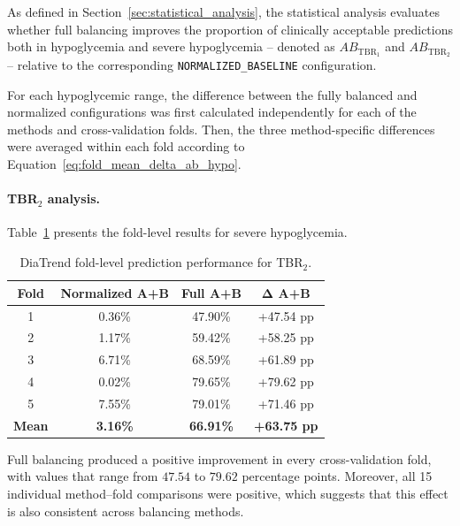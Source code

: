 As defined in Section~\ref{sec:statistical_analysis}, the statistical analysis evaluates whether full balancing improves the proportion of clinically acceptable predictions both in hypoglycemia and severe hypoglycemia -- denoted as \(AB_{\mathrm{TBR_1}}\) and \(AB_{\mathrm{TBR_2}}\) -- relative to the corresponding \texttt{NORMALIZED\_BASELINE} configuration.

For each hypoglycemic range, the difference between the fully balanced and normalized configurations was first calculated independently for each of the methods and cross-validation folds. Then, the three method-specific differences were averaged within each fold according to Equation~\ref{eq:fold_mean_delta_ab_hypo}.

\paragraph{TBR$_2$ analysis.}

Table~\ref{tab:diatrend_fold_tbr2_effect} presents the fold-level results for severe hypoglycemia.

\begin{table}[htbp]
    \centering
    \caption{DiaTrend fold-level prediction performance for TBR$_2$.}
    \label{tab:diatrend_fold_tbr2_effect}
    \begin{tabular}{cccc}
        \toprule
        \textbf{Fold}
        & \textbf{Normalized A+B}
        & \textbf{Full A+B}
        & \(\boldsymbol{\Delta}\) \textbf{A+B} \\
        \midrule
        1 & 0.36\% & 47.90\% & +47.54 pp \\
        2 & 1.17\% & 59.42\% & +58.25 pp \\
        3 & 6.71\% & 68.59\% & +61.89 pp \\
        4 & 0.02\% & 79.65\% & +79.62 pp \\
        5 & 7.55\% & 79.01\% & +71.46 pp \\
        \midrule
        \textbf{Mean}
        & \textbf{3.16\%}
        & \textbf{66.91\%}
        & \textbf{+63.75 pp} \\
        \bottomrule
    \end{tabular}
\end{table}

Full balancing produced a positive improvement in every cross-validation fold, with values that range from \(47.54\) to \(79.62\) percentage points. Moreover, all 15 individual method--fold comparisons were positive, which suggests that this effect is also consistent across balancing methods.


